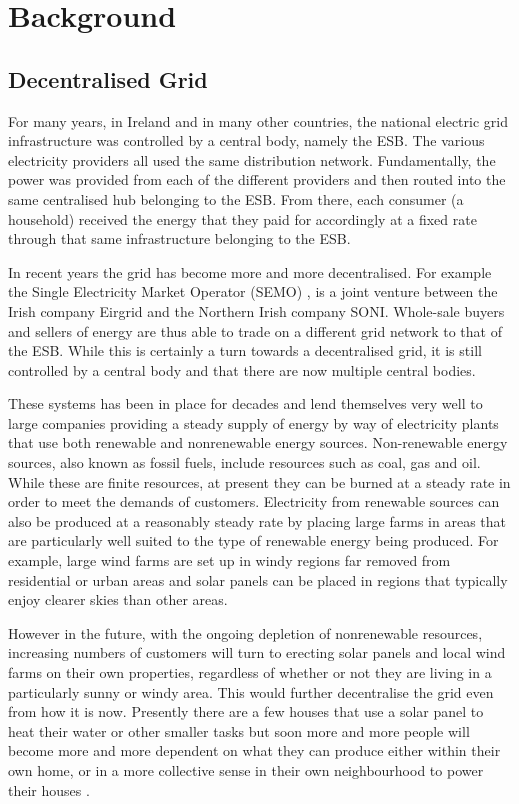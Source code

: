\documentclass[a4paper, notitlepage]{report}
\begin{document}
\part{Background}
\label{sec:org0a1e55c}
\chapter{Decentralised Grid}
\label{sec:org71717c0}
For many years, in Ireland and in many other countries, the national electric grid
infrastructure was controlled by a central body, namely the ESB. The various
electricity providers all used the same distribution network. Fundamentally, the
power was provided from each of the different providers and then routed into the
same centralised hub belonging to the ESB. From there, each consumer (a
household) received the energy that they paid for accordingly at a fixed rate
through that same infrastructure belonging to the ESB.

In recent years the grid has become more and more decentralised. For example the
Single Electricity Market Operator (SEMO) \cite{semo}, is a joint venture between
the Irish company Eirgrid and the Northern Irish company SONI. Whole-sale buyers
and sellers of energy are thus able to trade on a different grid network to that
of the ESB. While this is certainly a turn towards a decentralised grid, it is
still controlled by a central body and that there are now multiple central
bodies.

These systems has been in place for decades and lend themselves very well to large
companies providing a steady supply of energy by way of electricity plants
that use both renewable and nonrenewable energy sources. Non-renewable energy
sources, also known as fossil fuels, include resources such as coal, gas and
oil. While these are finite resources, at present they can be burned at a steady
rate in order to meet the demands of customers. Electricity from renewable
sources can also be produced at a reasonably steady rate by placing large farms
in areas that are particularly well suited to the type of renewable energy being
produced. For example, large wind farms are set up in windy regions far removed
from residential or urban areas and solar panels can be placed in regions that
typically enjoy clearer skies than other areas.

However in the future, with the ongoing depletion of nonrenewable resources,
increasing numbers of customers will turn to erecting solar panels and local
wind farms on their own properties, regardless of whether or not they are
living in a particularly sunny or windy area. This would further decentralise
the grid even from how it is now. Presently there are a few houses
that use a solar panel to heat their water or other smaller tasks but soon more
and more people will become more and more dependent on what they can produce
either within their own home, or in a more collective sense in their own
neighbourhood to power their houses \cite{apergis2010renewable}.
\end{document}
